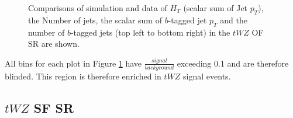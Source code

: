 \begin{figure}[htbp]
\caption{Comparisons of simulation and data of $H_{T}$ (scalar sum of Jet $p_{T}$), the Number of jets, the scalar sum of $b$-tagged jet $p_{T}$ and the number of $b$-tagged jets (top left to bottom right) in the $tWZ$ OF SR are shown.}\label{fig:4lep-OF-SR-jets-bjet} 
\end{figure}All bins for each plot in Figure \ref{fig:4lep-OF-SR-jets-bjet} have $\frac{signal}{background}$ exceeding 0.1 and are therefore blinded. This region is therefore enriched in $tWZ$ signal events.

\subsection{$tWZ$ SF SR}
\label{sec:controlplotstetralepton-tWZ-SF-SR}


